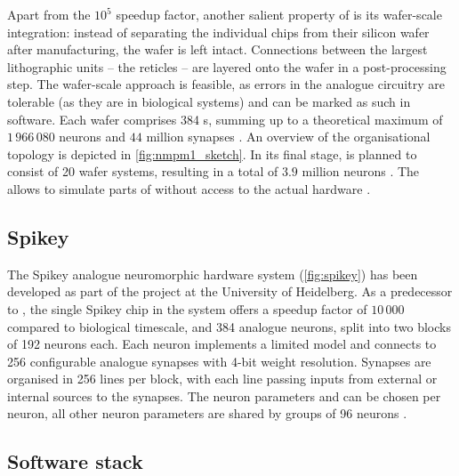 Apart from the $10^5$ speedup factor, another salient property of \NMPM is its wafer-scale integration: instead of separating the individual \HICANN chips from their silicon wafer after manufacturing, the wafer is left intact. Connections between the largest lithographic units -- the reticles -- are layered onto the wafer in a post-processing step. The wafer-scale approach is feasible, as errors in the analogue circuitry are tolerable (as they are in biological systems) and can be marked
as such in software. Each wafer comprises 384 {\HICANN}s, summing up to a theoretical maximum of $1\,966\,080$ neurons and $44$ million synapses \cite{petrovici2014characterization}. An overview of the organisational topology is depicted in \cref{fig:nmpm1_sketch}. In its final stage, \NMPM is planned to consist of 20 wafer systems, resulting in a total of $3.9$ million neurons \cite{hbp_neuromorphic_platform}. The \ESS allows to simulate parts of \NMPM without access to the actual hardware \cite{bruderle2011comprehensive}.

\subsection{Spikey}
\label{sec:spikey}

The Spikey analogue neuromorphic hardware system (\cref{fig:spikey}) has been developed as part of the \FACETS project at the University of Heidelberg. As a predecessor to \HICANN, the single Spikey chip in the system offers a speedup factor of $10\,000$ compared to biological timescale, and 384 analogue neurons, split into two blocks of 192 neurons each.
Each neuron implements a limited \LIF model and connects to 256 configurable analogue synapses with 4-bit weight resolution. Synapses are organised in 256 lines per block, with each line passing inputs from external or internal sources to the synapses. The neuron parameters \TauRef and \Gl can be chosen per neuron, all other neuron parameters are shared by groups of 96 neurons \cite{pfeil2013six}.

\subsection{Software stack}
\label{sec:pynn}

